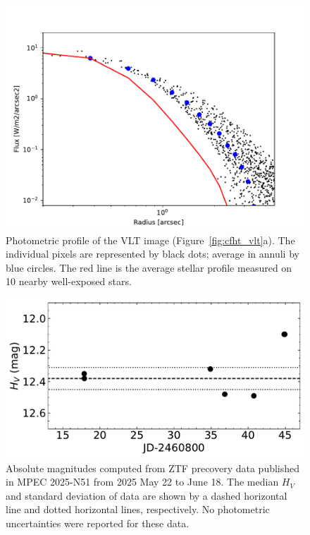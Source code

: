 \documentclass[linenumbers,twocolumn,longbib]{aastex7}
\begin{document}
\begin{figure}
    \includegraphics[width=1.\linewidth]{static/3I_profile.pdf}
\caption{Photometric profile of the VLT image (Figure~\ref{fig:cfht_vlt}a). The individual pixels are represented by black dots; average in annuli by blue circles. The red line is the average stellar profile measured on 10 nearby well-exposed stars.
}
\label{fig:vlt_profile}
\end{figure}

\begin{figure}
    \includegraphics[width=1.\linewidth]{static/fig_ztf_secular_lc.pdf}
    \caption{Absolute magnitudes computed from ZTF precovery data published in MPEC 2025-N51 from 2025 May 22 to June 18.  The median $H_V$ and standard deviation of data  are shown by a dashed horizontal line and dotted horizontal lines, respectively. No photometric uncertainties were reported for these data.}
\label{fig:ztf_secular}
\end{figure}
\end{document}
